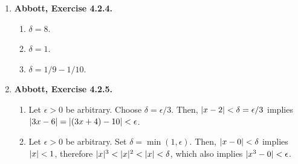 \documentclass{article}
\DeclarePairedDelimiter\abs{\lvert}{\rvert}
\newcommand{\N}{\mathbf{N}}
\newcommand{\Q}{\mathbf{Q}}
\newcommand{\R}{\mathbf{R}}
\newcommand{\set}[1]{\{#1\}}
\newcommand{\exc}[2][Abbott]{\item \textbf{#1, Exercise #2.}}
\newcommand{\lep}[1][L]{#1et $\epsilon > 0$ be arbitrary}
\begin{document}
\begin{enumerate}
\begin{enumerate}
        \item $\lim(t(x_n)) = \lim(t(y_n)) = \lim(t(z_n)) = 0$.
        
        \item We claim that $\lim_{x \to 1} t(x) = 0$. \lep. If $\epsilon > 1$, then $\abs{t(x)} = t(x) < \epsilon$ for all $x$, so we can set $\delta$ to any positive real number. Otherwise, choose some arbitrary $a \in A = \set{x \in \R : t(x) \geq \epsilon}$. Notice that every $b \in A$ is rational, otherwise we would have $t(b) = 0 < \epsilon$. Assume $a$ is a limit point of $A$. Then, for every $n \in \N$ there is some $x_n \in A$ such that $x_n \in V_{1/n}(a)$ and $x_n \neq a$. Since $x_n \in \Q$, we can write it as $p_n/q_n$ for integers $p_n/q_n$ in the lowest terms, such that $q_n > 0$. Then, Lemma (\ref{lem_rationalAproximations}) guarantees that there is some $N \in \N$ such that $1/q_N < \epsilon$. But, $t(x_N) = t(p_N/q_N) = 1/q_N$ which should be greater than or equal to $\epsilon$, since $x_N \in A$. This contradiction means that $A$ has no limit points, only isolated points.
        
        Notice that $1 \in A$, since $t(1) = t(1/1) = 1 \geq 1$ (recall that we are assuming that $\epsilon \leq 1$). By our previous discussion, $1$ must be an isolated point of $A$. This means that there is some $V_\delta(1)$ which does not intersect $A$, except possibly at $1$. In other words, for every $x \in V_\delta(1)$ (except $x = 1$), we must have $t(x) = \abs*{t(x)-0} < \epsilon$, which we can also write as $t(x) \in V_\epsilon(0)$. By definition 4.2.1B, we can conclude that $\lim_{x \to 1} t(x) = 0$, just as we conjectured.
    \end{enumerate}
    
    \exc{4.2.4}
    \begin{enumerate}
        \item $\delta = 8$.
        \item $\delta = 1$.
        \item $\delta = 1/9-1/10$.
    \end{enumerate}
    
    \exc{4.2.5}
    \begin{enumerate}
        \item \lep. Choose $\delta = \epsilon/3$. Then, $\abs*{x-2} < \delta = \epsilon/3$ implies $\abs*{3x-6} = \abs*{(3x+4) - 10} < \epsilon$.
        
        \item \lep. Set $\delta = \min(1, \epsilon)$. Then, $\abs*{x-0} < \delta$ implies $\abs{x} < 1$, therefore $\abs{x}^3 < \abs{x}^2 < \abs{x} < \delta$, which also implies $\abs{x^3 - 0} < \epsilon$.
        

\end{enumerate}
\end{enumerate}
\end{document}
